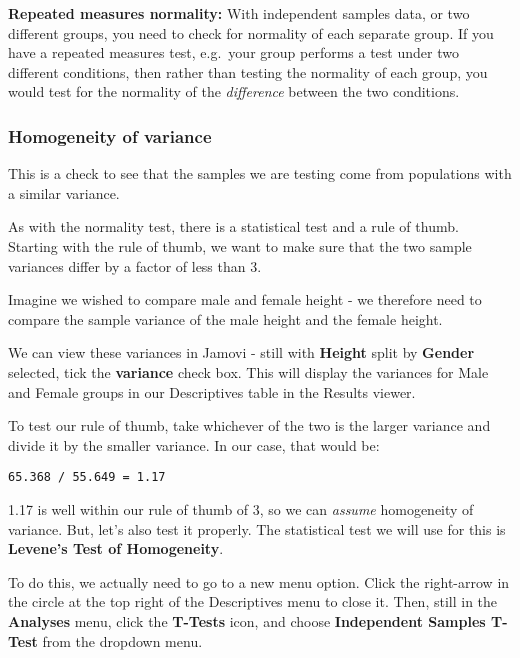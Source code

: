 \documentclass[
  letterpaper,
  DIV=11,
  numbers=noendperiod]{scrartcl}
\begin{document}
\begin{tcolorbox}[beforeafter skip=1cm, ignore nobreak=true, breakable, colframe=Aside-frame, colback=Aside-bg, coltext=Aside-text, boxsep=2mm, arc=0mm, boxrule=0.5mm]

\textbf{Repeated measures normality:} With independent samples data, or
two different groups, you need to check for normality of each separate
group. If you have a repeated measures test, e.g.~your group performs a
test under two different conditions, then rather than testing the
normality of each group, you would test for the normality of the
\emph{difference} between the two conditions.

\end{tcolorbox}

\hypertarget{homogeneity-of-variance}{%
\subsubsection{Homogeneity of variance}\label{homogeneity-of-variance}}

This is a check to see that the samples we are testing come from
populations with a similar variance.

As with the normality test, there is a statistical test and a rule of
thumb. Starting with the rule of thumb, we want to make sure that the
two sample variances differ by a factor of less than 3.

Imagine we wished to compare male and female height - we therefore need
to compare the sample variance of the male height and the female height.

We can view these variances in Jamovi - still with \textbf{Height} split
by \textbf{Gender} selected, tick the \textbf{variance} check box. This
will display the variances for Male and Female groups in our
Descriptives table in the Results viewer.

To test our rule of thumb, take whichever of the two is the larger
variance and divide it by the smaller variance. In our case, that would
be:

\begin{verbatim}
65.368 / 55.649 = 1.17
\end{verbatim}

1.17 is well within our rule of thumb of 3, so we can \emph{assume}
homogeneity of variance. But, let's also test it properly. The
statistical test we will use for this is \textbf{Levene's Test of
Homogeneity}.

To do this, we actually need to go to a new menu option. Click the
right-arrow in the circle at the top right of the Descriptives menu to
close it. Then, still in the \textbf{Analyses} menu, click the
\textbf{T-Tests} icon, and choose \textbf{Independent Samples T-Test}
from the dropdown menu.
\end{document}
